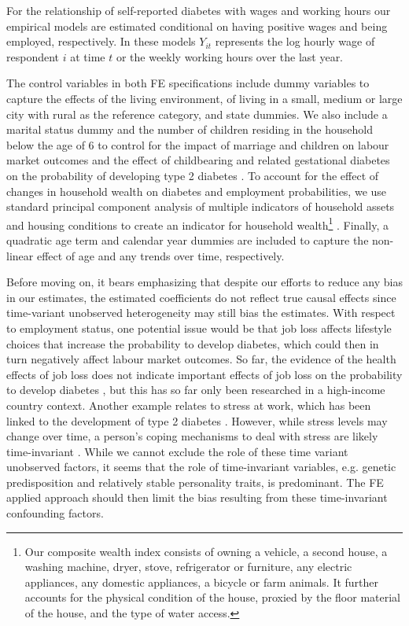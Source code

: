 For the relationship of self-reported diabetes with wages and working hours our empirical models are estimated conditional on having positive wages and being employed, respectively. In these models $Y_{it}$ represents the log hourly wage of respondent $i$ at time $t$ or the weekly working hours over the last year.

The control variables in both \ac{FE} specifications include dummy variables to capture the effects of the living environment,
of living in a small, medium or large city with rural as the reference category, and state dummies. We also include a marital status dummy and the number of children residing in the household below the age of 6 to control for the impact of marriage and children
on labour market outcomes and the effect of childbearing and related gestational diabetes on the probability of developing type 2 diabetes
\parencite{Bellamy2009}. To account for the effect of changes in household wealth on diabetes and employment probabilities, we use standard
principal component analysis of multiple indicators of household assets and housing conditions to create an indicator for household wealth\footnote{Our composite wealth index consists of owning a vehicle, a second house, a washing machine, dryer, stove, refrigerator or furniture, any electric appliances, any domestic appliances, a bicycle or farm animals. It further accounts for the physical condition of the house, proxied by the floor material of the house, and the type of water access.}
\parencite{Filmer2001}. Finally, a quadratic age term and calendar year dummies are included to capture the non-linear effect of age and any trends over time, respectively.

Before moving on, it bears emphasizing that despite our efforts to reduce any bias in our estimates, the estimated coefficients do not reflect true causal effects since time-variant unobserved heterogeneity may still bias the estimates. With respect to employment status, one potential issue would be that job loss affects lifestyle choices that increase the probability to develop diabetes, which could then in turn negatively affect labour market outcomes. So far, the evidence of the health effects of job loss does not indicate important effects of job loss on the probability to develop diabetes \parencite{Bergemann2011,Schaller2015}, but this has so far only been researched in a high-income country context. Another example relates to stress at work, which has been linked to the development of type 2 diabetes \parencite{Heraclides2012,Eriksson2013}. However, while stress levels may change over time, a person's coping mechanisms to deal with stress are likely time-invariant \parencite{Schneiderman2005}. While we cannot exclude the role of these time variant unobserved factors, it seems that the role of time-invariant variables, e.g. genetic predisposition and relatively stable personality traits, is predominant. The \ac{FE} applied approach should then limit the bias resulting from these time-invariant confounding factors. 


